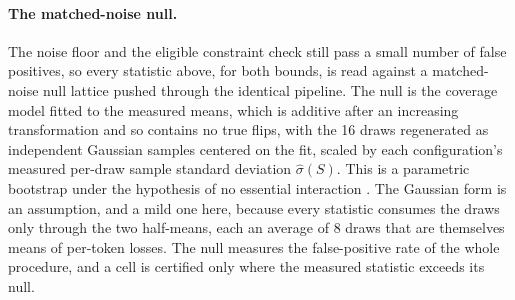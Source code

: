\paragraph{The matched-noise null.} The noise floor and the eligible constraint check still pass a small number of
false positives, so every statistic above, for both bounds, is read against a matched-noise null lattice
pushed through the identical pipeline. The null is the coverage model fitted to the measured means, which
is additive after an increasing transformation and so contains no true flips, with the 16 draws
regenerated as independent Gaussian samples centered on the fit, scaled by each configuration's measured
per-draw sample standard deviation $\hat\sigma(S)$. This is a parametric bootstrap under the hypothesis of no
essential interaction \citep[Section~6.5]{efron1993bootstrap}. The Gaussian form is an assumption, and a mild
one here, because every statistic consumes the draws only through the two half-means, each an average of
8 draws that are themselves means of per-token losses.
The null measures the false-positive rate of the whole procedure, and a cell
is certified only where the measured statistic exceeds its null.


